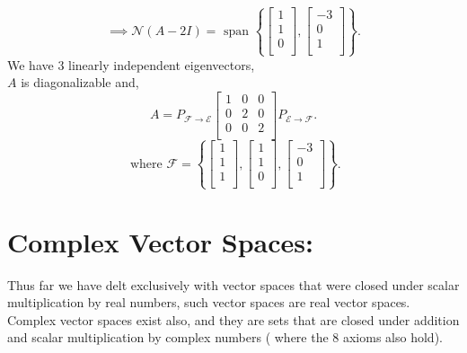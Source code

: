\documentclass{report}
\begin{document}
{\begin{multicols}{2}
  \end{multicols}
  \[
	  \implies \mathcal{N} \left( A-2I \right) = \text{ span } \left\{ \begin{bmatrix}
	  1\\
	  1\\
	  0\\
	  \end{bmatrix}
	  , \begin{bmatrix}
	  -3\\
	  0\\
	  1\\
	  \end{bmatrix}
	   \right\} 
  .\] 
  We have 3 linearly independent eigenvectors,\\
  $ A$ is diagonalizable and, \\
  \[
  A = P _{ \mathcal{F} \to \mathcal{E}}       \begin{bmatrix}
  1 & 0 & 0\\
  0 & 2 & 0\\
  0 & 0 & 2\\
  \end{bmatrix} P _{ \mathcal{E} \to \mathcal{F}}
  .\] 
  \[
	  \text{ where } \mathcal{F} = \left\{ \begin{bmatrix}
	  1\\
	  1\\
	  1\\
	  \end{bmatrix}
	  , \begin{bmatrix}
	  1\\
	  1\\
	  0\\
	  \end{bmatrix}
	  , \begin{bmatrix}
	  -3\\
	  0\\
	  1\\
	  \end{bmatrix}
	   \right\} 
  .\] 
   }
   
   \section{Complex Vector Spaces:}
   Thus far we have delt exclusively with vector spaces  that were closed under scalar multiplication by real numbers, such vector spaces are real vector spaces. Complex vector spaces exist also, and they are sets that are closed under addition and scalar multiplication by complex numbers ( where the 8 axioms also hold).\\
\end{document}
